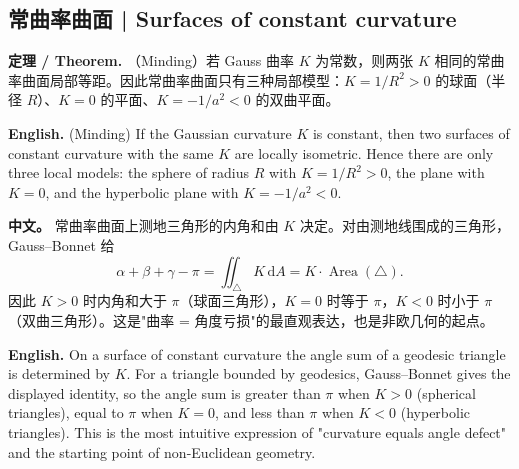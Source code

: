 \documentclass[UTF8,11pt,a4paper]{ctexart}
\newcommand{\APS}[2]{\par\noindent\textbf{中文。} #1\par\noindent\textbf{English.} #2\par\smallskip}
\newcommand{\EN}[1]{\par\noindent \textbf{English.} #1\par}
\newcommand{\THM}[2]{\par\noindent\textbf{定理 / Theorem.} #1\par\EN{#2}\par\smallskip}
\newcommand{\dd}{\mathrm{d}}
\begin{document}
\subsection{常曲率曲面 | Surfaces of constant curvature}
\THM{（Minding）若 Gauss 曲率 $K$ 为常数，则两张 $K$ 相同的常曲率曲面局部等距。因此常曲率曲面只有三种局部模型：$K=1/R^2>0$ 的球面（半径 $R$）、$K=0$ 的平面、$K=-1/a^2<0$ 的双曲平面。}{(Minding) If the Gaussian curvature $K$ is constant, then two surfaces of constant curvature with the same $K$ are locally isometric. Hence there are only three local models: the sphere of radius $R$ with $K=1/R^2>0$, the plane with $K=0$, and the hyperbolic plane with $K=-1/a^2<0$.}
\APS{常曲率曲面上测地三角形的内角和由 $K$ 决定。对由测地线围成的三角形，Gauss--Bonnet 给
\[
\alpha+\beta+\gamma-\pi=\iint_\triangle K\,\dd A=K\cdot\operatorname{Area}(\triangle).
\]
因此 $K>0$ 时内角和大于 $\pi$（球面三角形），$K=0$ 时等于 $\pi$，$K<0$ 时小于 $\pi$（双曲三角形）。这是"曲率 = 角度亏损"的最直观表达，也是非欧几何的起点。}{On a surface of constant curvature the angle sum of a geodesic triangle is determined by $K$. For a triangle bounded by geodesics, Gauss--Bonnet gives the displayed identity, so the angle sum is greater than $\pi$ when $K>0$ (spherical triangles), equal to $\pi$ when $K=0$, and less than $\pi$ when $K<0$ (hyperbolic triangles). This is the most intuitive expression of "curvature equals angle defect" and the starting point of non-Euclidean geometry.}
\end{document}
